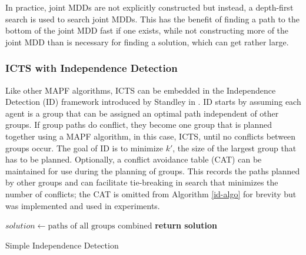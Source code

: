 \documentclass[english]{article}
\begin{document}
	In practice, joint MDDs are not explicitly constructed but instead, a depth-first search is used to search joint MDDs. This has the benefit of finding a path to the bottom of the joint MDD fast if one exists, while not constructing more of the joint MDD than is necessary for finding a solution, which can get rather large.
	\subsubsection{ICTS with Independence Detection}
	Like other MAPF algorithms, ICTS can be embedded in the Independence Detection (ID) framework introduced by Standley in \cite{standley2010}. ID starts by assuming each agent is a group that can be assigned an optimal path independent of other groups. If group paths do conflict, they become one group that is planned together using a MAPF algorithm, in this case, ICTS, until no conflicts between groups occur. The goal of ID is to minimize $k'$, the size of the largest group that has to be planned. Optionally, a conflict avoidance table (CAT) can be maintained for use during the planning of groups. This records the paths planned by other groups and can facilitate tie-breaking in search that minimizes the number of conflicts; the CAT is omitted from Algorithm \ref{id-algo} for brevity but was implemented and used in experiments.
	\begin{algorithm}
		\begin{algorithmic}[1]
			\State {}
			\State {}
			\Repeat
			\State {}
			\State {}
			\State {}
			\State $solution\gets\text{paths of all groups combined}$
			\State \textbf{return solution}
		\end{algorithmic}
		\caption{Simple Independence Detection \cite{standley2010}} 
		\label{id-algo}
	\end{algorithm}
\end{document}
